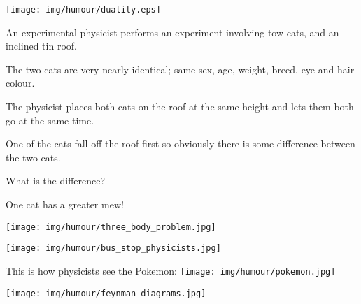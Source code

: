 	\begin{center}\underline{\hspace{5 cm}}\end{center}

	\begin{center}
	\texttt{[image: img/humour/duality.eps]}
	\end{center}
	
	\begin{center}\underline{\hspace{5 cm}}\end{center}
	An experimental physicist performs an experiment involving tow cats, and an inclined tin roof.
	
	The two cats are very nearly identical; same sex, age, weight, breed, eye and hair colour.
	
	The physicist places both cats on the roof at the same height and lets them both go at the same time.
	
	One of the cats fall off the roof first so obviously there is some difference between the two cats.
	
	What is the difference?
	
	One cat has a greater mew!
	
	\begin{center}\underline{\hspace{5 cm}}\end{center}
	
	\begin{center}
	\texttt{[image: img/humour/three\_body\_problem.jpg]}
	\end{center}
	
	\begin{center}\underline{\hspace{5 cm}}\end{center}
	
	\begin{center}
	\texttt{[image: img/humour/bus\_stop\_physicists.jpg]}
	\end{center}
	
	\begin{center}\underline{\hspace{5 cm}}\end{center}
	
	\begin{center}
		This is how physicists see the Pokemon:
		\texttt{[image: img/humour/pokemon.jpg]}
	\end{center}
	
	\begin{center}
	\texttt{[image: img/humour/feynman\_diagrams.jpg]}
	\end{center}
	
